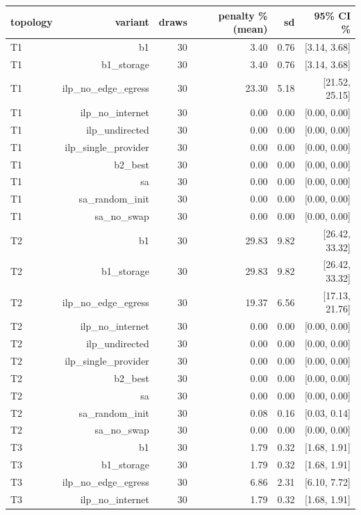 \begin{table}[t]
\centering
\small
\begin{tabular}{lrrrrr}
\toprule
topology & variant & draws & penalty \% (mean) & sd & 95\% CI \% \\
\midrule
T1 & b1 & 30 & 3.40 & 0.76 & [3.14, 3.68] \\
T1 & b1\_storage & 30 & 3.40 & 0.76 & [3.14, 3.68] \\
T1 & ilp\_no\_edge\_egress & 30 & 23.30 & 5.18 & [21.52, 25.15] \\
T1 & ilp\_no\_internet & 30 & 0.00 & 0.00 & [0.00, 0.00] \\
T1 & ilp\_undirected & 30 & 0.00 & 0.00 & [0.00, 0.00] \\
T1 & ilp\_single\_provider & 30 & 0.00 & 0.00 & [0.00, 0.00] \\
T1 & b2\_best & 30 & 0.00 & 0.00 & [0.00, 0.00] \\
T1 & sa & 30 & 0.00 & 0.00 & [0.00, 0.00] \\
T1 & sa\_random\_init & 30 & 0.00 & 0.00 & [0.00, 0.00] \\
T1 & sa\_no\_swap & 30 & 0.00 & 0.00 & [0.00, 0.00] \\
T2 & b1 & 30 & 29.83 & 9.82 & [26.42, 33.32] \\
T2 & b1\_storage & 30 & 29.83 & 9.82 & [26.42, 33.32] \\
T2 & ilp\_no\_edge\_egress & 30 & 19.37 & 6.56 & [17.13, 21.76] \\
T2 & ilp\_no\_internet & 30 & 0.00 & 0.00 & [0.00, 0.00] \\
T2 & ilp\_undirected & 30 & 0.00 & 0.00 & [0.00, 0.00] \\
T2 & ilp\_single\_provider & 30 & 0.00 & 0.00 & [0.00, 0.00] \\
T2 & b2\_best & 30 & 0.00 & 0.00 & [0.00, 0.00] \\
T2 & sa & 30 & 0.00 & 0.00 & [0.00, 0.00] \\
T2 & sa\_random\_init & 30 & 0.08 & 0.16 & [0.03, 0.14] \\
T2 & sa\_no\_swap & 30 & 0.00 & 0.00 & [0.00, 0.00] \\
T3 & b1 & 30 & 1.79 & 0.32 & [1.68, 1.91] \\
T3 & b1\_storage & 30 & 1.79 & 0.32 & [1.68, 1.91] \\
T3 & ilp\_no\_edge\_egress & 30 & 6.86 & 2.31 & [6.10, 7.72] \\
T3 & ilp\_no\_internet & 30 & 1.79 & 0.32 & [1.68, 1.91] \\

\end{tabular}
\end{table}
